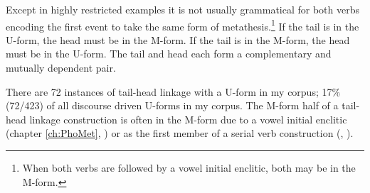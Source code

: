 Except in highly restricted examples it is not
usually grammatical for both verbs encoding the first
event to take the same form of metathesis.\footnote{
		When both verbs are followed by a vowel initial enclitic, both may be in the M-form.}
If the tail is in the U-form, the head must be in the \mbox{M-form}.
If the tail is in the M-form, the head must be in the U-form.
The tail and head each form a complementary and mutually dependent pair.

There are 72 instances of tail-head linkage with a U-form in my corpus;
17{\%} (72/423) of all discourse driven U-forms in my corpus.
The M-form half of a tail-head
linkage construction is often in the M-form due to
a vowel initial enclitic (chapter \ref{ch:PhoMet}, )
or as the first member of a serial verb construction (, ).